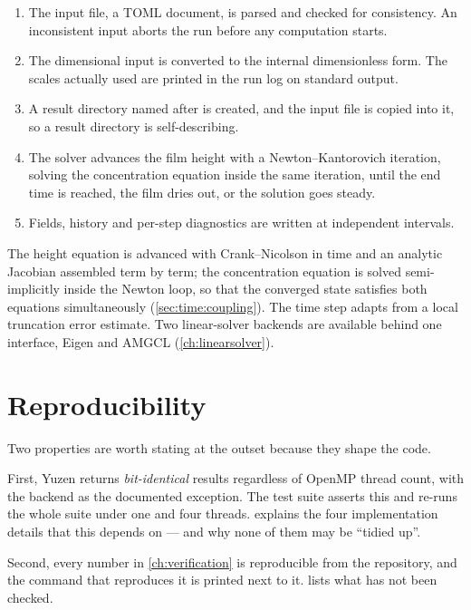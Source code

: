 \begin{enumerate}
  \item The input file, a TOML document, is parsed and checked for
        consistency. An inconsistent input aborts the run before any
        computation starts.
  \item The dimensional input is converted to the internal dimensionless form.
        The scales actually used are printed in the run log on standard
        output.
  \item A result directory named after  is created, and the input
        file is copied into it, so a result directory is self-describing.
  \item The solver advances the film height with a Newton--Kantorovich
        iteration, solving the concentration equation inside the same
        iteration, until the end time is reached, the film dries out, or the
        solution goes steady.
  \item Fields, history and per-step diagnostics are written at independent
        intervals.
\end{enumerate}

The height equation is advanced with Crank--Nicolson in time and an analytic
Jacobian assembled term by term; the concentration equation is solved
semi-implicitly inside the Newton loop, so that the converged state satisfies
both equations simultaneously (\cref{sec:time:coupling}). The time step adapts
from a local truncation error estimate. Two linear-solver backends are
available behind one interface, Eigen and AMGCL (\cref{ch:linearsolver}).

\section{Reproducibility}
\label{sec:intro:repro}

Two properties are worth stating at the outset because they shape the code.

First, Yuzen returns \emph{bit-identical} results regardless of OpenMP thread
count, with the  backend as the documented exception. The test
suite asserts this and  re-runs the whole suite under one and four
threads.  explains the four implementation details
that this depends on --- and why none of them may be ``tidied up''.

Second, every number in \cref{ch:verification} is reproducible from the
repository, and the command that reproduces it is printed next to it.
 lists what has not been checked.

